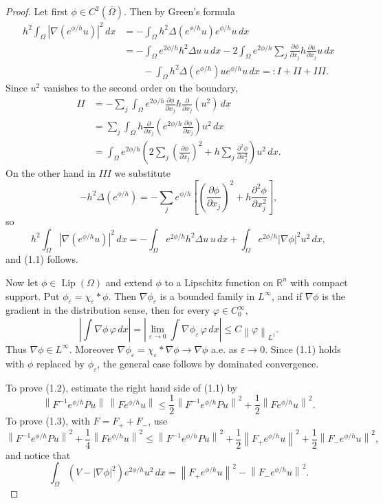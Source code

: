 \documentclass[11pt,a4paper]{article}
\newcommand{\R}{\mathbb R}
\newcommand{\Lip}{\operatorname{Lip}}
\newcommand{\eps}{\varepsilon}
\newcommand{\norm}[1]{\left\lVert #1\right\rVert}
\numberwithin{equation}{section}
\theoremstyle{remark}
\begin{document}
\begin{proof}
Let first $\phi\in C^2(\overline\Omega)$. Then by Green's formula
\begin{align*}
h^2\int_\Omega |\nabla(e^{\phi/h}u)|^2\,dx
&=-\int_\Omega h^2\Delta(e^{\phi/h}u)e^{\phi/h}u\,dx\\
&=-\int_\Omega e^{2\phi/h}h^2\Delta u\,u\,dx
-2\int_\Omega e^{2\phi/h}\sum_j\frac{\partial\phi}{\partial x_j}h\frac{\partial u}{\partial x_j}u\,dx\\
&\qquad-\int_\Omega h^2\Delta(e^{\phi/h})u e^{\phi/h}u\,dx
=:I+II+III.
\end{align*}
Since $u^2$ vanishes to the second order on the boundary,
\begin{align*}
II
&=-\sum_j\int_\Omega e^{2\phi/h}\frac{\partial\phi}{\partial x_j}h\frac{\partial}{\partial x_j}(u^2)\,dx\\
&=\sum_j\int_\Omega h\frac{\partial}{\partial x_j}\left(e^{2\phi/h}\frac{\partial\phi}{\partial x_j}\right)u^2\,dx\\
&=\int_\Omega e^{2\phi/h}\left(2\sum_j\left(\frac{\partial\phi}{\partial x_j}\right)^2+h\sum_j\frac{\partial^2\phi}{\partial x_j^2}\right)u^2\,dx.
\end{align*}
On the other hand in $III$ we substitute
\[
-h^2\Delta(e^{\phi/h})=-\sum_j e^{\phi/h}\left[\left(\frac{\partial\phi}{\partial x_j}\right)^2+h\frac{\partial^2\phi}{\partial x_j^2}\right],
\]
so
\[
h^2\int_\Omega|\nabla(e^{\phi/h}u)|^2\,dx
=-\int_\Omega e^{2\phi/h}h^2\Delta u\,u\,dx+
\int_\Omega e^{2\phi/h}|\nabla\phi|^2u^2\,dx,
\]
and (1.1) follows.

Now let $\phi\in\Lip(\Omega)$ and extend $\phi$ to a Lipschitz function on $\R^n$ with compact support. Put $\phi_\eps=\chi_\eps*\phi$. Then $\nabla\phi_\eps$ is a bounded family in $L^\infty$, and if $\nabla\phi$ is the gradient in the distribution sense, then for every $\varphi\in C_0^\infty$,
\[
\left|\int\nabla\phi\,\varphi\,dx\right|
=\left|\lim_{\eps\to0}\int\nabla\phi_\eps\,\varphi\,dx\right|
\le C\norm{\varphi}_{L^1}.
\]
Thus $\nabla\phi\in L^\infty$. Moreover $\nabla\phi_\eps=\chi_\eps*\nabla\phi\to\nabla\phi$ a.e. as $\eps\to0$. Since (1.1) holds with $\phi$ replaced by $\phi_\eps$, the general case follows by dominated convergence.

To prove (1.2), estimate the right hand side of (1.1) by
\[
\norm{F^{-1}e^{\phi/h}Pu}\,\norm{Fe^{\phi/h}u}
\le\frac12\norm{F^{-1}e^{\phi/h}Pu}^2+\frac12\norm{Fe^{\phi/h}u}^2.
\]
To prove (1.3), with $F=F_++F_-$, use
\[
\norm{F^{-1}e^{\phi/h}Pu}^2+\frac14\norm{Fe^{\phi/h}u}^2
\le \norm{F^{-1}e^{\phi/h}Pu}^2+\frac12\norm{F_+e^{\phi/h}u}^2+\frac12\norm{F_-e^{\phi/h}u}^2,
\]
and notice that
\[
\int_\Omega(V-|\nabla\phi|^2)e^{2\phi/h}u^2\,dx
=\norm{F_+e^{\phi/h}u}^2-\norm{F_-e^{\phi/h}u}^2.
\]
\end{proof}
\end{document}

